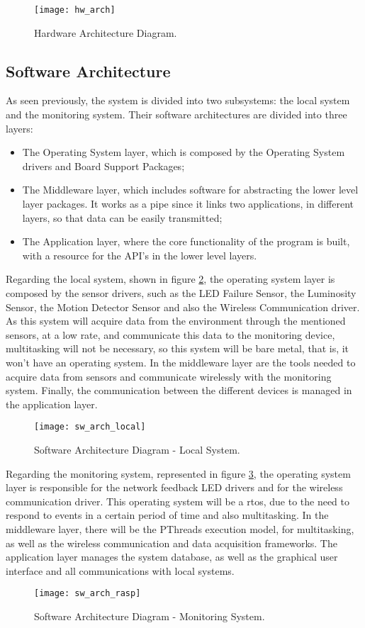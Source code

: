 \begin{figure}[ht]
	\centering
	\texttt{[image: hw\_arch]}
	\caption{Hardware Architecture Diagram.}
	\label{fig:hw_arch}
\end{figure}

\subsection{Software Architecture}
As seen previously, the system is divided into two subsystems: the local system and the monitoring system. Their software architectures are divided into three layers:

\begin{itemize}
	\item The Operating System layer, which is composed by the Operating System drivers and Board Support Packages;
	\item The Middleware layer, which includes software for abstracting the lower level layer packages. It works as a pipe since it links two applications, in different layers, so that data can be easily transmitted;
	\item The Application layer, where the core functionality of the program is built, with a resource for the API's in the lower level layers.
\end{itemize}

Regarding the local system, shown in figure \ref{fig:sw_arch_local}, the operating system layer is composed by the sensor drivers, such as the LED Failure Sensor, the Luminosity Sensor, the Motion Detector Sensor and also the Wireless Communication driver. As this system will acquire data from the environment through the mentioned sensors, at a low rate, and communicate this data to the monitoring device, multitasking will not be necessary, so this system will be bare metal, that is, it won’t have an operating system. In the middleware layer are the tools needed to acquire data from sensors and communicate wirelessly with the monitoring system. Finally, the communication between the different devices is managed in the application layer.

\begin{figure}[ht]
	\centering
	\texttt{[image: sw\_arch\_local]}
	\caption{Software Architecture Diagram - Local System.}
	\label{fig:sw_arch_local}
\end{figure}

Regarding the monitoring system, represented in figure \ref{fig:sw_arch_rasp}, the operating system layer is responsible for the network feedback LED drivers and for the wireless communication driver. This operating system will be a \ac{rtos}, due to the need to respond to events in a certain period of time and also multitasking. In the middleware layer, there will be the PThreads execution model, for multitasking, as well as the wireless communication and data acquisition frameworks. The application layer manages the system database, as well as the graphical user interface and all communications with local systems.

\begin{figure}[ht]
	\centering
	\texttt{[image: sw\_arch\_rasp]}
	\caption{Software Architecture Diagram - Monitoring System.}
	\label{fig:sw_arch_rasp}
\end{figure}
